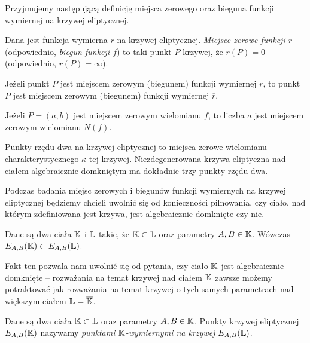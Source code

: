 Przyjmujemy następującą definicję
miejsca zerowego oraz bieguna funkcji wymiernej na krzywej eliptycznej.

\begin{definition}
Dana jest funkcja wymierna $r$ na krzywej eliptycznej.
\emph{Miejsce zerowe funkcji $r$} (odpowiednio, \emph{biegun funkcji $f$})
to taki punkt $P$ krzywej, że $r(P) = 0$ (odpowiednio, $r(P) = \infty$).
\end{definition}

\begin{fact}
Jeżeli punkt $P$
jest miejscem zerowym (biegunem) funkcji wymiernej $r$,
to punkt $\overline{P}$
jest miejscem zerowym (biegunem) funkcji wymiernej $\overline{r}$.
\end{fact}

\begin{corollary}\label{zero_of_norm_coro}
Jeżeli $P = (a, b)$ jest miejscem zerowym wielomianu $f$,
to liczba $a$ jest miejscem zerowym wielomianu $N(f)$.
\end{corollary}

\begin{fact}
Punkty rzędu dwa na krzywej eliptycznej
to miejsca zerowe wielomianu charakterystycznego $\kappa$ tej krzywej.
Niezdegenerowana krzywa eliptyczna nad ciałem algebraicznie domkniętym
ma dokładnie trzy punkty rzędu dwa.
\end{fact}

Podczas badania miejsc zerowych i biegunów
funkcji wymiernych na krzywej eliptycznej
będziemy chcieli uwolnić się od konieczności pilnowania,
czy ciało, nad którym zdefiniowana jest krzywa,
jest algebraicznie domknięte czy nie.

\begin{fact}
Dane są dwa ciała $\mathbb{K}$ i $\mathbb{L}$ takie, że $\mathbb{K} \subset \mathbb{L}$
oraz parametry $A,B \in \mathbb{K}$.
Wówczas $E_{A,B}(\mathbb{K}) \subset E_{A,B}(\mathbb{L})$.
\end{fact}

Fakt ten pozwala nam uwolnić się od pytania,
czy ciało $\mathbb{K}$ jest algebraicznie domknięte --
rozważania na temat krzywej nad ciałem $\mathbb{K}$
zawsze możemy potraktować
jak rozważania na temat krzywej o tych samych parametrach
nad większym ciałem $\mathbb{L} = \overline{\mathbb{K}}$.

\begin{definition}
Dane są dwa ciała $\mathbb{K} \subset \mathbb{L}$ oraz parametry $A, B \in \mathbb{K}$.
Punkty krzywej eliptycznej $E_{A,B}(\mathbb{K})$
nazywamy \emph{punktami $\mathbb{K}$-wymiernymi na krzywej $E_{A,B}(\mathbb{L})$}.
\end{definition}


